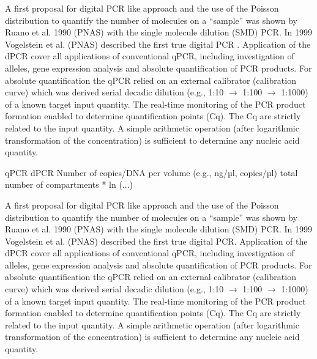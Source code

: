 \documentclass{bioinfo}
\begin{document}
A first proposal for digital PCR like approach and the use of the Poisson 
distribution to quantify the number of molecules on a ``sample'' was shown by 
Ruano et al. 1990 (PNAS) with the single molecule dilution (SMD) PCR. In 1999 
Vogelstein et al. (PNAS) described the first true digital PCR \cite{morley_digital_2014}. Application of 
the dPCR cover all applications of conventional qPCR, including investigation of 
alleles, gene expression analysis and absolute quantification of PCR products. 
For absolute quantification the qPCR relied on an external calibrator 
(calibration curve) which was derived serial decadic dilution (e.g., 1:10 $\rightarrow$ 
1:100 $\rightarrow$ 1:1000) of a known target input quantity. The real-time monitoring of 
the PCR product formation enabled to determine quantification points (Cq). The 
Cq are strictly related to the input quantity. A simple arithmetic operation 
(after logarithmic transformation of the concentration) is sufficient to 
determine any nucleic acid quantity.

qPCR	dPCR
Number of copies/DNA per volume (e.g., ng/µl, copies/µl)	total number of compartments * ln (...)

A first proposal for digital PCR like approach and the use of the Poisson distribution to quantify the number of molecules on a ``sample'' was shown by Ruano et al. 1990 (PNAS) with the single molecule dilution (SMD) PCR. In 1999 Vogelstein et al. (PNAS) described the first true digital PCR. Application of the dPCR cover all applications of conventional qPCR, including investigation of alleles, gene expression analysis and absolute quantification of PCR products. For absolute quantification the qPCR relied on an external calibrator (calibration curve) which was derived serial decadic dilution (e.g., 1:10 $\rightarrow$ 1:100 $\rightarrow$ 1:1000) of a known target input quantity. The real-time monitoring of the PCR product formation enabled to determine quantification points (Cq). The Cq are strictly related to the input quantity. A simple arithmetic operation (after logarithmic transformation of the concentration) is sufficient to determine any nucleic acid quantity.
\end{document}
